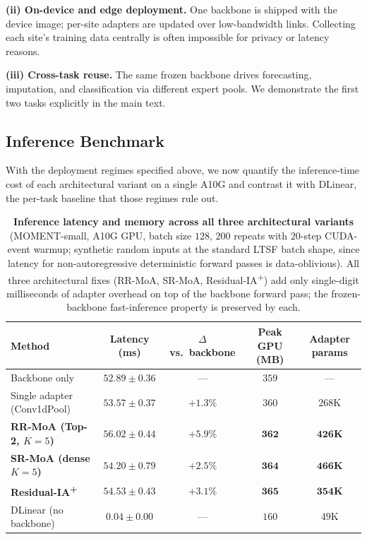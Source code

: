 \documentclass{article}
\begin{document}
\textbf{(ii) On-device and edge deployment.} One backbone is shipped with the device image; per-site adapters are updated over low-bandwidth links. Collecting each site's training data centrally is often impossible for privacy or latency reasons.

\textbf{(iii) Cross-task reuse.} The same frozen backbone drives forecasting, imputation, and classification via different expert pools. We demonstrate the first two tasks explicitly in the main text.

\subsection{Inference Benchmark}
\label{app:benchmark}

With the deployment regimes specified above, we now quantify the inference-time cost of each architectural variant on a single A10G and contrast it with DLinear, the per-task baseline that those regimes rule out.

\begin{table}[!htbp]
\centering
\caption{\textbf{Inference latency and memory across all three architectural variants} (MOMENT-small, A10G GPU, batch size $128$, $200$ repeats with $20$-step CUDA-event warmup; synthetic random inputs at the standard LTSF batch shape, since latency for non-autoregressive deterministic forward passes is data-oblivious). All three architectural fixes (RR-MoA, SR-MoA, Residual-IA\textsuperscript{+}) add only single-digit milliseconds of adapter overhead on top of the backbone forward pass; the frozen-backbone fast-inference property is preserved by each.}
\label{tab:benchmark}
\small
\begin{tabular}{@{}lcccc@{}}
\toprule
Method & Latency (ms) & $\Delta$ vs.\ backbone & Peak GPU (MB) & Adapter params \\
\midrule
Backbone only                                & $52.89 \pm 0.36$ & ---            & $359$ & --- \\
Single adapter (Conv1dPool)                  & $53.57 \pm 0.37$ & $+1.3\%$       & $360$ & $268$K \\
\textbf{RR-MoA (Top-2, $K{=}5$)}             & $\mathbf{56.02 \pm 0.44}$ & $\mathbf{+5.9\%}$ & $\mathbf{362}$ & $\mathbf{426}$\textbf{K} \\
\textbf{SR-MoA (dense $K{=}5$)}              & $\mathbf{54.20 \pm 0.79}$ & $\mathbf{+2.5\%}$ & $\mathbf{364}$ & $\mathbf{466}$\textbf{K} \\
\textbf{Residual-IA\textsuperscript{+}}      & $\mathbf{54.53 \pm 0.43}$ & $\mathbf{+3.1\%}$ & $\mathbf{365}$ & $\mathbf{354}$\textbf{K} \\
\midrule
\rowcolor{gray!8} DLinear (no backbone)      & $0.04 \pm 0.00$ & ---            & $160$ & $49$K \\
\bottomrule
\end{tabular}
\end{table}
\end{document}
